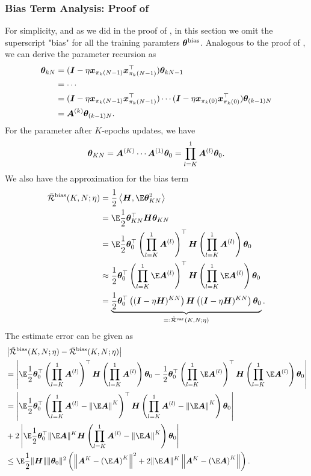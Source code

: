 \subsubsection{Bias Term Analysis: Proof of }\label{app:bias-proof}
For simplicity, and as we did in the proof of , in this section we omit the superscript "bias" for all the training paramters ${\bm{\theta}}^{\mathrm{bias}}$. Analogous to the proof of , we can derive the parameter recursion as 
\begin{align*}
    {\bm{\theta}}_{kN} &= ({\bm{I}}-\eta {\bm{x}}_{\pi_k(N-1)}{\bm{x}}_{\pi_k(N-1)}^{\top}){\bm{\theta}}_{kN-1} \\
    &= \cdots \\
    &= ({\bm{I}}-\eta {\bm{x}}_{\pi_k(N-1)}{\bm{x}}_{\pi_k(N-1)}^{\top})\cdots({\bm{I}}-\eta {\bm{x}}_{\pi_k(0)}{\bm{x}}_{\pi_k(0)}^{\top}){\bm{\theta}}_{(k-1)N} \\
    &={\bm{A}}^{(k)}{\bm{\theta}}_{(k-1)N}.
\end{align*}
For the parameter after $K$-epochs updates, we have
\[{\bm{\theta}}_{KN}={\bm{A}}^{(K)}\cdots{\bm{A}}^{(1)}{\bm{\theta}}_0=\prod_{l=K}^1 {\bm{A}}^{(l)}{\bm{\theta}}_0.\]
We also have the approximation for the bias term   
\begin{align*}
    \bar{\cR}^{\bias}(K,N;\eta) &= \frac{1}{2}\inp{\mH}{\E\vtheta_{KN}^2} \\
    &= \E\frac{1}{2}\vtheta_{KN}^{\top}\mH\vtheta_{KN} \\
    &= \E\frac{1}{2}\vtheta_0^{\top}\left(\prod_{l=K}^1 \mA^{(l)}\right)^{\top}\mH\left(\prod_{l=K}^1 \mA^{(l)}\right)\vtheta_0 \\
    &\approx \frac{1}{2}\vtheta_0^{\top}\left(\prod_{l=K}^1 \E\mA^{(l)}\right)^{\top}\mH\left(\prod_{l=K}^1 \E\mA^{(l)}\right)\vtheta_0 \\
    &=\underbrace{\frac{1}{2}\vtheta_0^{\top}\left((\mI-\eta\mH)^{KN}\right)\mH\left((\mI-\eta\mH)^{KN}\right)\vtheta_0}_{=:\Tilde{\cR}^{\var}(K,N;\eta)}.
\end{align*}
The estimate error can be given as
\begin{align}
    &\left|\Tilde{\cR}^{\bias}(K, N;\eta) -\bar{\cR}^{\bias}(K,N;\eta)\right| \notag\\
    &= \left|\E\frac{1}{2}\vtheta_0^{\top}\left(\prod_{l=K}^1 \mA^{(l)}\right)^{\top}\mH\left(\prod_{l=K}^1 \mA^{(l)}\right)\vtheta_0-\frac{1}{2}\vtheta_0^{\top}\left(\prod_{l=K}^1 \E\mA^{(l)}\right)^{\top}\mH\left(\prod_{l=K}^1 \E\mA^{(l)}\right)\vtheta_0\right| \notag\\
    &= \left|\E\frac{1}{2}\vtheta_0^{\top}\left(\prod_{l=K}^1 \mA^{(l)}-\left\|\E\mA\right\|^K\right)^{\top}\mH\left(\prod_{l=K}^1 \mA^{(l)}-\left\|\E\mA\right\|^K\right)\vtheta_0\right| \notag\\
    &+2\left|\E\frac{1}{2}\vtheta_0^{\top}\|\E\mA\|^{K}\mH\left(\prod_{l=K}^1 \mA^{(l)}-\left\|\E\mA\right\|^K\right)\vtheta_0\right|\notag \\
    &\leq\E\frac{1}{2}\|\mH\|\|\vtheta_0\|^2\left(\lnormnone{\mA^K-\left(\E\mA\right)^K}^2+2\|\E\mA\|^K\lnormnone{\mA^K-\left(\E\mA\right)^K}\right). \label{equ:convex-bias-A-EA-bound} 
\end{align}
